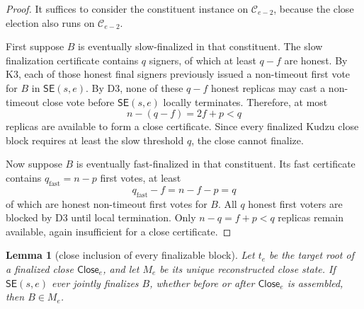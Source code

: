\documentclass[11pt]{article}
\newtheorem{lemma}{Lemma}
\theoremstyle{remark}
\newcommand{\C}{\mathcal{C}}
\newcommand{\SE}{\mathsf{SE}}
\newcommand{\CE}{\mathsf{Close}}
\begin{document}
\begin{proof}
It suffices to consider the constituent instance on $\C_{e-2}$, because the close election also runs on $\C_{e-2}$.

First suppose $B$ is eventually slow-finalized in that constituent. The slow finalization certificate contains $q$ signers, of which at least $q-f$ are honest. By K3, each of those honest final signers previously issued a non-timeout first vote for $B$ in $\SE(s,e)$. By D3, none of these $q-f$ honest replicas may cast a non-timeout close vote before $\SE(s,e)$ locally terminates. Therefore, at most
\[
  n-(q-f)=2f+p<q
\]
replicas are available to form a close certificate. Since every finalized Kudzu close block requires at least the slow threshold $q$, the close cannot finalize.

Now suppose $B$ is eventually fast-finalized in that constituent. Its fast certificate contains $q_{\mathrm{fast}}=n-p$ first votes, at least
\[
  q_{\mathrm{fast}}-f=n-f-p=q
\]
of which are honest non-timeout first votes for $B$. All $q$ honest first voters are blocked by D3 until local termination. Only $n-q=f+p<q$ replicas remain available, again insufficient for a close certificate.
\end{proof}

\begin{lemma}[close inclusion of every finalizable block]
\label{lem:close-inclusion}
Let $t_e$ be the target root of a finalized close $\CE_e$, and let $M_e$ be its unique reconstructed close state. If $\SE(s,e)$ ever jointly finalizes $B$, whether before or after $\CE_e$ is assembled, then $B\in M_e$.
\end{lemma}
\end{document}
